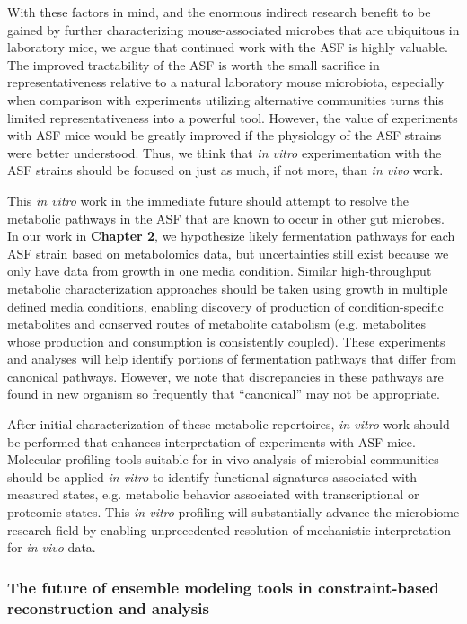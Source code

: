 \documentclass[11pt,twocolumn,notitlepage,openany,twoside]{book}
\begin{document}
\begin{refsection}
With these factors in mind, and the enormous indirect research benefit to be gained by further characterizing mouse-associated microbes that are ubiquitous in laboratory mice, we argue that continued work with the ASF is highly valuable. The improved tractability of the ASF is worth the small sacrifice in representativeness relative to a natural laboratory mouse microbiota, especially when comparison with experiments utilizing alternative communities turns this limited representativeness into a powerful tool. However, the value of experiments with ASF mice would be greatly improved if the physiology of the ASF strains were better understood. Thus, we think that \textit{in vitro} experimentation with the ASF strains should be focused on just as much, if not more, than \textit{in vivo} work.

This \textit{in vitro} work in the immediate future should attempt to resolve the metabolic pathways in the ASF that are known to occur in other gut microbes. In our work in \textbf{Chapter 2}, we hypothesize likely fermentation pathways for each ASF strain based on metabolomics data, but uncertainties still exist because we only have data from growth in one media condition. Similar high-throughput metabolic characterization approaches should be taken using growth in multiple defined media conditions, enabling discovery of production of condition-specific metabolites and conserved routes of metabolite catabolism (e.g. metabolites whose production and consumption is consistently coupled). These experiments and analyses will help identify portions of fermentation pathways that differ from canonical pathways. However, we note that discrepancies in these pathways are found in new organism so frequently that “canonical” may not be appropriate.

After initial characterization of these metabolic repertoires, \textit{in vitro} work should be performed that enhances interpretation of experiments with ASF mice. Molecular profiling tools suitable for in vivo analysis of microbial communities should be applied \textit{in vitro} to identify functional signatures associated with measured states, e.g. metabolic behavior associated with transcriptional or proteomic states. This \textit{in vitro} profiling will substantially advance the microbiome research field by enabling unprecedented resolution of mechanistic interpretation for \textit{in vivo} data.

\subsubsection{The future of ensemble modeling tools in constraint-based reconstruction and analysis}


\end{refsection}
\end{document}
